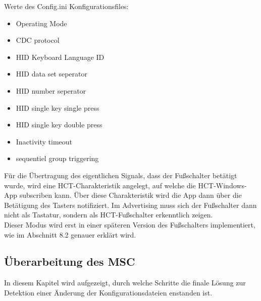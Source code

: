 Werte des Config.ini Konfigurationsfiles:
\begin{itemize}
	\item Operating Mode 
	\item \ac{CDC} protocol 
	\item HID Keyboard Language ID 
	\item HID data set seperator 
	\item HID number seperator
	\item HID single key single press
	\item HID single key double press
	\item Inactivity timeout
	\item sequentiel group triggering 
\end{itemize}

Für die Übertragung des eigentlichen Signals, dass der Fußschalter betätigt wurde, wird eine \ac{HCT}-Charakteristik angelegt, auf welche die \ac{HCT}-Windows-App subscriben kann. Über diese Charakteristik wird die App dann über die Betätigung des Tasters notifiziert. Im Advertising muss sich der Fußschalter dann nicht als Tastatur, sondern als \ac{HCT}-Fußschalter erkenntlich zeigen.\\
Dieser Modus wird erst in einer späteren Version des Fußschalters implementiert, wie im Abschnitt 8.2 genauer erklärt wird.

\subsection{Überarbeitung des MSC}
\label{UberarbeitungMSC}
In diesem Kapitel wird aufgezeigt, durch welche Schritte die finale Lösung zur Detektion einer Änderung der Konfigurationsdateien enstanden ist.

